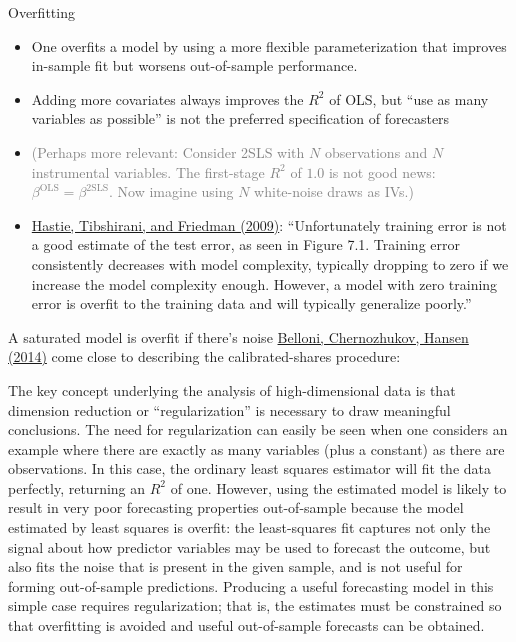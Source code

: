 \documentclass[11pt,notes=hide,aspectratio=169]{beamer}
\begin{document}
\begin{frame}{Overfitting}
\begin{itemize}
\item
One overfits a model by using a more flexible parameterization that improves in-sample fit but worsens out-of-sample performance.
\item
Adding more covariates always improves the $R^2$ of OLS, but ``use as many variables as possible'' is not the preferred specification of forecasters 
\item[]
\textcolor{gray}{(Perhaps more relevant: Consider 2SLS with $N$ observations and $N$ instrumental variables. The first-stage $R^2$ of $1.0$ is not good news: $\beta^{\text{OLS}} = \beta^{\text{2SLS}}$. Now imagine using $N$ white-noise draws as IVs.)}
\item
\href{https://hastie.su.domains/ElemStatLearn/}{Hastie, Tibshirani, and Friedman (2009)}:
``Unfortunately training error is not a good estimate of the test error, as seen in Figure 7.1. Training error consistently decreases with model complexity, typically dropping to zero if we increase the model complexity enough. However, a model with zero training error is overfit to the training data and will typically generalize poorly.''
\end{itemize}
\end{frame}
\begin{frame}{A saturated model is overfit if there's noise}
\href{https://www.aeaweb.org/articles?id=10.1257/jep.28.2.29}{Belloni, Chernozhukov, Hansen (2014)} come close to describing the calibrated-shares procedure:\\
{\small
The key concept underlying the analysis of high-dimensional data is that dimension reduction or ``regularization'' is necessary to draw meaningful conclusions. The need for regularization can easily be seen when one considers an example where there are exactly as many variables (plus a constant) as there are observations. In this case, the ordinary least squares estimator will fit the data perfectly, returning an $R^2$ of one. However, using the estimated model is likely to result in very poor forecasting properties out-of-sample because the model estimated by least squares is overfit: the least-squares fit captures not only the signal about how predictor variables may be used to forecast the outcome, but also fits the noise that is present in the given sample, and is not useful for forming out-of-sample predictions. Producing a useful forecasting model in this simple case requires regularization; that is, the estimates must be constrained so that overfitting is avoided and useful out-of-sample forecasts can be obtained.
\par}
\end{frame}
\end{document}
